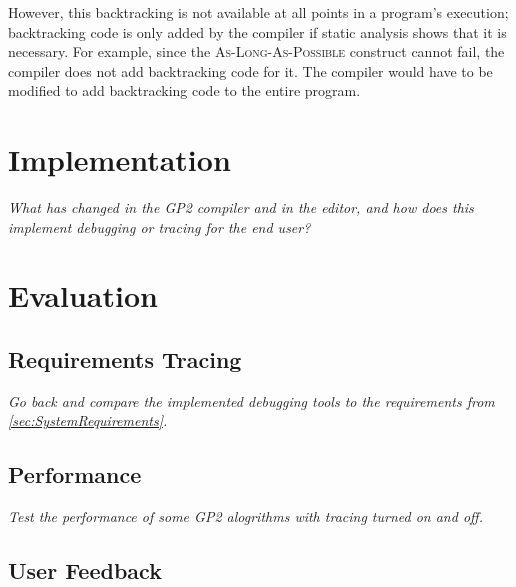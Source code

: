 \documentclass[authoryearcitations]{UoYCSproject}
\begin{document}
However, this backtracking is not available at all points in a program's
execution; backtracking code is only added by the compiler if static analysis
shows that it is necessary. For example, since the \textsc{As-Long-As-Possible}
construct cannot fail, the compiler does not add backtracking code for it. The
compiler would have to be modified to add backtracking code to the entire
program.

\clearpage


\chapter{Implementation}
\label{cha:Implementation}

\emph{What has changed in the GP2 compiler and in the editor, and how does this
implement debugging or tracing for the end user?}

\clearpage


\chapter{Evaluation}
\label{cha:Evaluation}

\section{Requirements Tracing}
\label{sec:RequirementsTracing}

\emph{Go back and compare the implemented debugging tools to the requirements
from \autoref{sec:SystemRequirements}.}


\section{Performance}
\label{sec:Performance}

\emph{Test the performance of some GP2 alogrithms with tracing turned on and off.}


\section{User Feedback}
\label{sec:UserFeedback}
\end{document}
